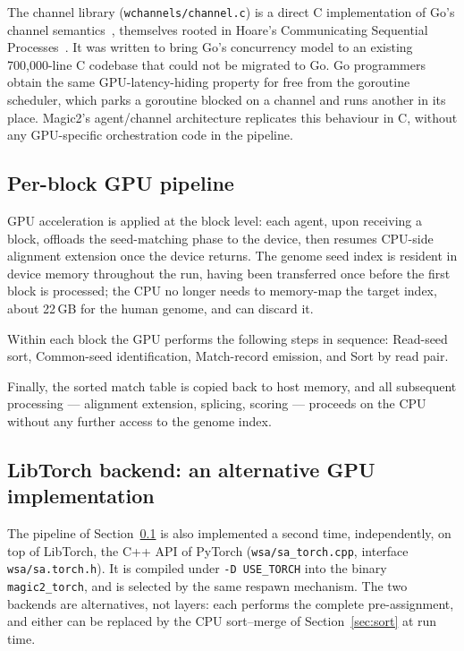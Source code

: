 \documentclass[11pt]{article}
\begin{document}
The channel library (\texttt{wchannels/channel.c}) is a direct C
implementation of Go's channel semantics~\citep{donovan2015go},
themselves rooted in Hoare's Communicating Sequential
Processes~\citep{hoare1978csp}.
It was written to bring Go's concurrency model to an existing
700{,}000-line C codebase that could not be migrated to Go.
Go programmers obtain the same GPU-latency-hiding property for free
from the goroutine scheduler, which parks a goroutine blocked on a
channel and runs another in its place.
Magic2's agent/channel architecture replicates this behaviour in C,
without any GPU-specific orchestration code in the pipeline.

\subsection{Per-block GPU pipeline}
\label{sec:gpu_pipeline}

GPU acceleration is applied at the block level: each agent, upon
receiving a block, offloads the seed-matching phase to the device,
then resumes CPU-side alignment extension once the device returns.
The genome seed index is resident in device memory throughout the
run, having been transferred once before the first block is
processed; the CPU no longer needs to memory-map the target index,
about 22\,GB for the human genome, and can discard it.

Within each block the GPU performs the following steps in sequence:
Read-seed sort, Common-seed identification, Match-record emission,
and Sort by read pair.


Finally, the sorted match table is copied back to host memory,
and all subsequent processing --- alignment extension, splicing,
scoring --- proceeds on the CPU without any further access to
the genome index.



\subsection{LibTorch backend: an alternative GPU implementation}
\label{sec:torch}

The pipeline of Section~\ref{sec:gpu_pipeline} is also implemented a
second time, independently, on top of LibTorch, the C++ API of PyTorch
(\texttt{wsa/sa\_torch.cpp}, interface \texttt{wsa/sa.torch.h}).
It is compiled under \texttt{-D USE\_TORCH} into the binary
\texttt{magic2\_torch}, and is selected by the same respawn mechanism.
The two backends are alternatives, not layers: each performs the
complete pre-assignment, and either can be replaced by the CPU
sort--merge of Section~\ref{sec:sort} at run time.
\end{document}
